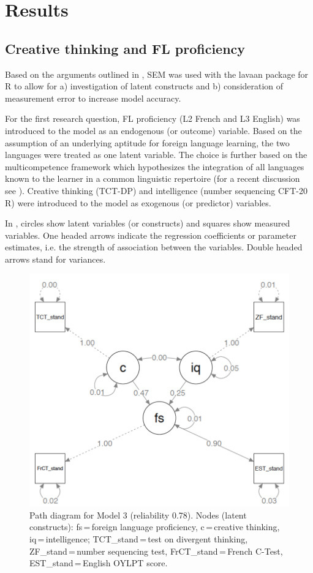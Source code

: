 \documentclass[output=paper]{langsci/langscibook}
\begin{document}
\section{Results}
\subsection{Creative thinking and FL proficiency}

Based on the arguments outlined in , SEM was used with the lavaan package for R \citep{Rosseel2012} to allow for a) investigation of latent constructs and b) consideration of measurement error to increase model accuracy. 

For the first research question, FL proficiency (L2 French and L3 English) was introduced to the model as an endogenous (or outcome) variable. Based on the assumption of an underlying aptitude for foreign language learning, the two languages were treated as one latent variable. The choice is further based on the multicompetence framework which hypothesizes the integration of all languages known to the learner in a common linguistic repertoire (for a recent discussion see \citealt{Cook2012}). Creative thinking (TCT-DP) and intelligence (number sequencing CFT-20 R) were introduced to the model as exogenous (or predictor) variables.

In , circles show latent variables (or constructs) and squares show measured variables. One headed arrows indicate the regression coefficients or parameter estimates, i.e. the strength of association between the variables. Double headed arrows stand for variances.

\begin{figure}
\includegraphics[width=\textwidth]{figures/Figure6.1.png}
\caption{\label{fig:06:1}Path diagram for Model 3 (reliability 0.78). Nodes (latent constructs): fs\,=\,foreign language proficiency, c\,=\,creative thinking, iq\,=\,intelligence; \mbox{TCT\_stand}\,=\,test on divergent thinking, \mbox{ZF\_stand}\,=\,number sequencing test, \mbox{FrCT\_stand}\,=\,French C-Test, \mbox{EST\_stand}\,=\,English OYLPT score.}
\end{figure}
\end{document}
